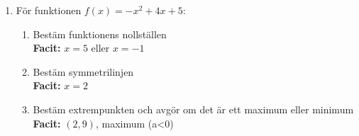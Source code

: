 \documentclass[a4paper,11pt]{article}
\begin{document}
\begin{enumerate}[label=\textbf{\arabic*.}]
    \item För funktionen $f(x) = -x^2 + 4x + 5$:
    \begin{enumerate}[label=\alph*)]
        \item Bestäm funktionens nollställen
        \\ \textbf{Facit:} $x=5$ eller $x=-1$
        \item Bestäm symmetrilinjen
        \\ \textbf{Facit:} $x=2$
        \item Bestäm extrempunkten och avgör om det är ett maximum eller minimum
        \\ \textbf{Facit:} $(2,9)$, maximum (a<0)
    \end{enumerate}
\end{enumerate}
\end{document}
